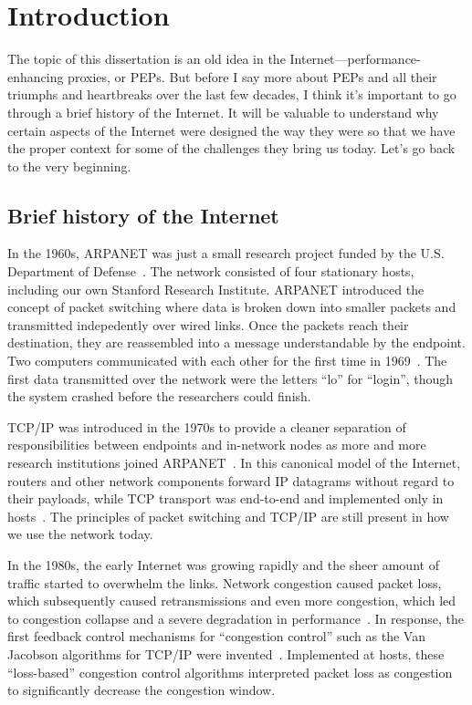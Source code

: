 \chapter{Introduction}
\label{sec:introduction}

The topic of this dissertation is an old idea in the
Internet---performance-enhancing proxies, or PEPs. But before I say more about
PEPs and all their triumphs and heartbreaks over the last few decades, I think
it's important to go through a brief history of the Internet. It will be
valuable to understand why certain aspects of the Internet were designed the
way they were so that we have the proper context for some of the challenges
they bring us today. Let's go back to the very beginning.

\section{Brief history of the Internet}

In the 1960s, ARPANET was just a small research project funded by the U.S.
Department of Defense~\cite{hauben2007history}. The network consisted of four
stationary hosts,
including our own Stanford Research Institute. ARPANET introduced the concept
of packet switching where data is broken down into smaller packets and
transmitted indepedently over wired links. Once the packets reach their
destination, they are reassembled into a message understandable by the
endpoint. Two computers communicated with each other for the first time in
1969~\cite{arpanet2019}. The first data transmitted over the network were the letters ``lo'' for
``login'', though the system crashed before the researchers could finish.

TCP/IP was introduced in the 1970s to provide a cleaner separation of
responsibilities between endpoints and in-network nodes as more and more
research institutions joined ARPANET~\cite{rfc675}. In this canonical model of
the Internet,
routers and other network components forward IP datagrams without regard to
their payloads, while TCP transport was end-to-end and implemented only in
hosts~\cite{saltzer1984endtoend,clark1988darpa}. The principles of packet
switching and TCP/IP are still present in how we use the network today.

In the 1980s, the early Internet was growing rapidly and the sheer amount of
traffic started to overwhelm the links. Network congestion caused packet loss,
which subsequently caused retransmissions and even more congestion, which led
to congestion collapse and a severe degradation in performance~\cite{rfc896}.
In response,
the first feedback control mechanisms for ``congestion control'' such as the
Van Jacobson algorithms for TCP/IP were invented~\cite{vjk}. Implemented at
hosts, these
``loss-based'' congestion control algorithms interpreted packet loss as
congestion to significantly decrease the congestion window.

